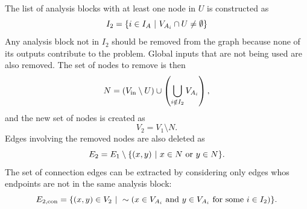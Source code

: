 \begin{description}
        The list of analysis blocks with at least one node in $U$ is constructed as
        \begin{equation}
        I_2 = \{ i \in I_A \ | \  V_{A_i} \cap U \neq \emptyset \}
        \end{equation}
        Any analysis block not in $I_2$ should be removed from the graph because none of its outputs contribute to the problem. Global inputs that are not being used are also removed. The set of nodes to remove is then
        \begin{equation}
        N = (V_\textrm{in}\setminus U )  \cup \left( \bigcup_{i \notin I_2} V_{A_i} \right),
        \end{equation}
and the new set of nodes is created as
        \begin{equation}
        V_2 = V_1 \setminus N.
        \end{equation}
        Edges involving the removed nodes are also deleted as
        \begin{equation}
        E_2 = E_1 \setminus \{ (x,y) \ | \  x \in N \textrm{ or } y \in N  \}.
        \end{equation}
        The set of connection edges can be extracted by considering only edges whos endpoints are not in the same analysis block:
        \begin{equation}
        E_{2,\textrm{con}} = \{(x,y) \in V_{2} \ | \  \sim(x \in V_{A_i} \textrm{ and } y \in V_{A_i} \textrm{ for some } i \in I_2)\}.
        \end{equation}
\end{description}

